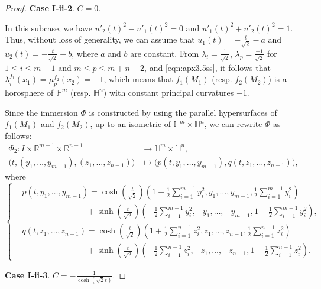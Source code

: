 \documentclass[reqno]{amsart}%
\theoremstyle{definition}
\numberwithin{equation}{section}
\begin{document}
\begin{proof}
{\bf Case I-ii-2}. $C=0$. 

In this subcase, we have $u'_{2}(t)^2-u'_{1}(t)^2=0$ and $u'_{1}(t)^2+u'_{2}(t)^2=1$. Thus, 
without loss of generality, we can assume that $u_{1}(t)=-\frac{t}{\sqrt{2}}-a$ and 
$u_{2}(t)=-\frac{t}{\sqrt{2}}-b$, where $a$ and $b$ are constant.
From $\lambda_i=\frac{1}{\sqrt{2}}$, $\lambda_p=\frac{-1}{\sqrt{2}}$ for $1\leq i\leq m-1$ and $m\leq p\leq m+n-2$, and \eqref{eqn:apx3.5ss}, it follows that  $\lambda^{f_1}_i(x_1)=\mu^{f_2}_p(x_2)=-1$, which means that $f_1(M_1)$ (resp. $f_2(M_2)$) is a horosphere of 
$\mathbb{H}^m$ (resp. $\mathbb{H}^n$) with constant principal curvatures $-1$. 

Since the immersion $\Phi$ is constructed by using the parallel hypersurfaces of $f_1(M_1)$ and $f_2(M_2)$, 
up to an isometric of $\mathbb{H}^m\times \mathbb{H}^n$, we can rewrite $\Phi$ as follows:  
\begin{equation}\label{eqn:ap3.1sss}
	\begin{aligned}
		\Phi_2:I\times \mathbb{R}^{m-1}\times \mathbb{R}^{n-1}&\longrightarrow \mathbb{H}^m\times \mathbb{H}^n,\\
		\big(t,(y_1,\ldots,y_{m-1}),(z_1,\ldots,z_{n-1})\big)&\longmapsto \big(p(t,y_1,\ldots,y_{m-1}),q(t,z_1,\ldots,z_{n-1})\big),
	\end{aligned}
\end{equation}
%
where
%
$$
\left\{\begin{aligned}
	&p(t,y_1,\ldots,y_{m-1})=\cosh(\frac{t}{\sqrt{2}})
	(1+\frac{1}{2}\sum_{i=1}^{m-1}y_i^2,y_1,\ldots,y_{m-1},\frac{1}{2}\sum_{i=1}^{m-1}y_i^2)\\
	&~~~~~~~~~~~~~~~~~~~~~~~~~~~~~~~~~~~                      +\sinh(\frac{t}{\sqrt{2}})(-\frac{1}{2}
	\sum_{i=1}^{m-1}y_i^2,-y_1,\ldots,-y_{m-1},1-\frac{1}{2}\sum_{i=1}^{m-1}y_i^2),\\
	&q(t,z_1,\ldots,z_{n-1})=\cosh(\frac{t}{\sqrt{2}})
	(1+\frac{1}{2}\sum_{i=1}^{n-1}z_i^2,z_1,\ldots,z_{n-1},\frac{1}{2}\sum_{i=1}^{n-1}z_i^2)\\
	&~~~~~~~~~~~~~~~~~~~~~~~~~~~~~~~~~~~           +\sinh(\frac{t}{\sqrt{2}})(-\frac{1}{2}
	\sum_{i=1}^{n-1}z_i^2,-z_1,\ldots,-z_{n-1},1-\frac{1}{2}\sum_{i=1}^{n-1}z_i^2).
\end{aligned}\right.
$$


{\bf Case I-ii-3}. $C=-\frac{1}{\cosh(\sqrt{2}t)}$. 


\end{proof}
\end{document}
